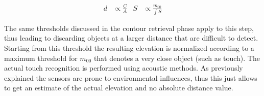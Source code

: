 \begin{align}
d&\propto{\tfrac{C}{A}} & S&\propto{\tfrac{m_{00}}{\int{S}}}
\end{align}

The same thresholds discussed in the contour retrieval phase apply to this step, thus leading to discarding objects at a larger distance that are difficult to detect. Starting from this threshold the resulting elevation is normalized according to a maximum threshold for $m_{00}$ that denotes a very close object (such as touch). The actual touch recognition is performed using acoustic methods. 
As previously explained the sensors are prone to environmental influences, thus this just allows to get an estimate of the actual elevation and no absolute distance value.